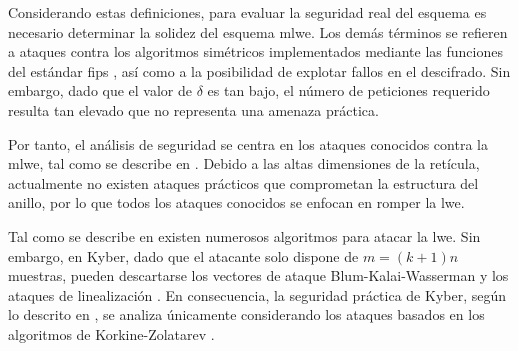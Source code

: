 Considerando estas definiciones, para evaluar la seguridad real del esquema es necesario determinar la solidez del esquema \acrshort{mlwe}. Los demás términos se refieren a ataques contra los algoritmos simétricos implementados mediante las funciones del estándar \acrshort{fips} \cite{FIPS202}, así como a la posibilidad de explotar fallos en el descifrado. Sin embargo, dado que el valor de $\delta$ es tan bajo, el número de peticiones requerido resulta tan elevado que no representa una amenaza práctica.
\newline

Por tanto, el análisis de seguridad se centra en los ataques conocidos contra la \acrshort{mlwe}, tal como se describe en \cite{kyber-spec-2021}. Debido a las altas dimensiones de la retícula, actualmente no existen ataques prácticos que comprometan la estructura del anillo, por lo que todos los ataques conocidos se enfocan en romper la \acrshort{lwe}.  
\newline

Tal como se describe en \cite{kyber-spec-2021} existen numerosos algoritmos para atacar la \acrshort{lwe}. Sin embargo, en Kyber, dado que el atacante solo dispone de \(m=(k+1)n\) muestras, pueden descartarse los vectores de ataque Blum-Kalai-Wasserman \cite{KirchnerFouque2015} y los ataques de linealización \cite{AroraGe2011}. En consecuencia, la seguridad práctica de Kyber, según lo descrito en \cite{kyber-spec-2021}, se analiza únicamente considerando los ataques basados en los algoritmos de Korkine-Zolatarev \cite{SchnorrEuchner1994}.
\newline

